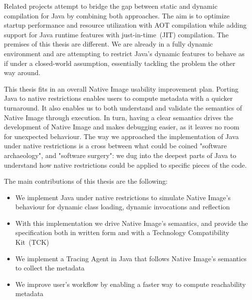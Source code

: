 Related projects attempt to bridge the gap between static and dynamic compilation for Java by combining both approaches. The aim is to optimize startup performance and resource utilization with AOT compilation while adding support for Java runtime features with just-in-time~(JIT) compilation. The premises of this thesis are different. We are already in a fully dynamic environment and are attempting to restrict Java's dynamic features to behave as if under a closed-world assumption, essentially tackling the problem the other way around. 

This thesis fits in an overall Native Image usability improvement plan. Porting Java to native restrictions enables users to compute metadata with a quicker turnaround. It also enables us to both understand and validate the semantics of Native Image through execution. In turn, having a clear semantics drives the development of Native Image and makes debugging easier, as it leaves no room for unexpected behaviour.
The way we approached the implementation of Java under native restrictions is a cross between what could be coined "software archaeology", and "software surgery": we dug into the deepest parts of Java to understand how native restrictions could be applied to specific pieces of the code.

The main contributions of this thesis are the following:
\begin{itemize}
  \item We implement Java under native restrictions to simulate Native Image's behaviour for dynamic class loading, dynamic invocations and reflection
  \item With this implementation we drive Native Image's semantics, and provide the specification both in written form and with a Technology Compatibility Kit~(TCK) 
  \item We implement a Tracing Agent in Java that follows Native Image's semantics to collect the metadata 
  \item We improve user's workflow by enabling a faster way to compute reachability metadata
\end{itemize}